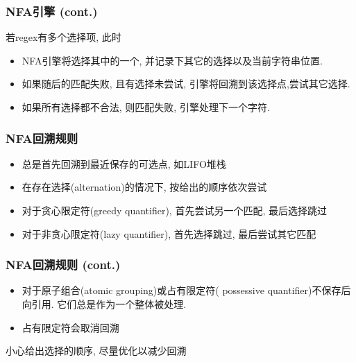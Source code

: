 \documentclass[compress]{beamer}
\begin{document}
\begin{frame}
\frametitle{NFA引擎 (cont.)}
  若regex有多个选择项, 此时
  \begin{itemize}
	\item NFA引擎将选择其中的一个, 
	  并记录下其它的选择以及当前字符串位置.
	\item 如果随后的匹配失败, 且有选择未尝试,
	  引擎将\alert{回溯}到该选择点,尝试其它选择. 
	\item 如果所有选择都不合法, 则匹配失败, 引擎处理下一个字符.
  \end{itemize}
\end{frame}

\begin{frame}
\frametitle{NFA回溯规则}

\begin{itemize}
\item 总是首先回溯到最近保存的可选点, 如LIFO堆栈
\item 在存在选择(alternation)的情况下, 按给出的顺序依次尝试
\item 对于贪心限定符(greedy quantifier), 首先尝试另一个匹配, 最后选择跳过
\item 对于非贪心限定符(lazy quantifier), 首先选择跳过, 最后尝试其它匹配
\end{itemize}
\end{frame}

\begin{frame}
  \frametitle{NFA回溯规则 (cont.)}
  \begin{itemize}
\item 对于原子组合(atomic grouping)或占有限定符(
possessive quantifier)不保存后向引用.
它们总是作为一个整体被处理.\\
\item 占有限定符会取消回溯
\end{itemize}
\alert{小心给出选择的顺序, 尽量优化以减少回溯}
\end{frame}
\end{document}
